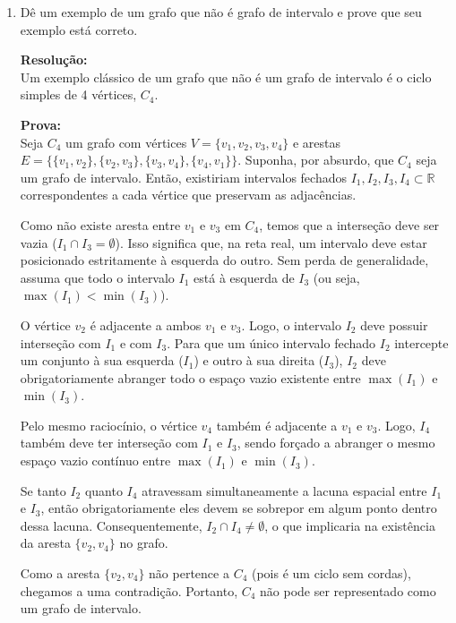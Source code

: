 \begin{enumerate}[label=\textbf{\arabic*.}, ref=\arabic*]
\begin{enumerate}
        \vspace{0.3cm}

        \item Dê um exemplo de um grafo que não é grafo de intervalo e prove que seu exemplo está correto.

        \noindent \textbf{Resolução:} \\
        Um exemplo clássico de um grafo que não é um grafo de intervalo é o ciclo simples de 4 vértices, $C_4$.
        
        \textbf{Prova:} \\
        Seja $C_4$ um grafo com vértices $V = \{v_1, v_2, v_3, v_4\}$ e arestas $E = \{\{v_1, v_2\}, \{v_2, v_3\}, \{v_3, v_4\}, \{v_4, v_1\}\}$.
        Suponha, por absurdo, que $C_4$ seja um grafo de intervalo. Então, existiriam intervalos fechados $I_1, I_2, I_3, I_4 \subset \mathbb{R}$ correspondentes a cada vértice que preservam as adjacências.
        
        Como não existe aresta entre $v_1$ e $v_3$ em $C_4$, temos que a interseção deve ser vazia ($I_1 \cap I_3 = \emptyset$). Isso significa que, na reta real, um intervalo deve estar posicionado estritamente à esquerda do outro. Sem perda de generalidade, assuma que todo o intervalo $I_1$ está à esquerda de $I_3$ (ou seja, $\max(I_1) < \min(I_3)$).
        
        O vértice $v_2$ é adjacente a ambos $v_1$ e $v_3$. Logo, o intervalo $I_2$ deve possuir interseção com $I_1$ e com $I_3$. Para que um único intervalo fechado $I_2$ intercepte um conjunto à sua esquerda ($I_1$) e outro à sua direita ($I_3$), $I_2$ deve obrigatoriamente abranger todo o espaço vazio existente entre $\max(I_1)$ e $\min(I_3)$.
        
        Pelo mesmo raciocínio, o vértice $v_4$ também é adjacente a $v_1$ e $v_3$. Logo, $I_4$ também deve ter interseção com $I_1$ e $I_3$, sendo forçado a abranger o mesmo espaço vazio contínuo entre $\max(I_1)$ e $\min(I_3)$.
        
        Se tanto $I_2$ quanto $I_4$ atravessam simultaneamente a lacuna espacial entre $I_1$ e $I_3$, então obrigatoriamente eles devem se sobrepor em algum ponto dentro dessa lacuna. Consequentemente, $I_2 \cap I_4 \neq \emptyset$, o que implicaria na existência da aresta $\{v_2, v_4\}$ no grafo. 
        
        Como a aresta $\{v_2, v_4\}$ não pertence a $C_4$ (pois é um ciclo sem cordas), chegamos a uma contradição. Portanto, $C_4$ não pode ser representado como um grafo de intervalo.
    \end{enumerate}


\end{enumerate}
